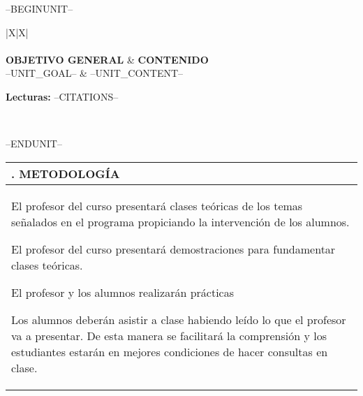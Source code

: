 \documentclass[final]{article}
\begin{document}
	\setcounter{SyllabiUnitCount}{0}
	--BEGINUNIT--
	\addtocounter{SyllabiUnitCount}{1}
	\begin{center}
	\begin{tabularx}{\textwidth}{|X|X|} \hline
	 \\ \hline
	 \\ \hline
	{\bf OBJETIVO GENERAL} & {\bf CONTENIDO} \\ \hline
	--UNIT_GOAL--
	&
	--UNIT_CONTENT--
	\\ \hline
	\multicolumn{2}{|l|}
	{\begin{minipage}{0.95\textwidth}
	{\bf Lecturas:} --CITATIONS--
	\end{minipage}
	}
	\\ \hline
	\end{tabularx}
	\end{center}
	
	--ENDUNIT--
	
	\addtocounter{SyllabiSectionCount}{1}
	\begin{center}
	\begin{tabularx}{\textwidth}{|X|} \hline
	\arabic{SyllabiSectionCount}. METODOLOGÍA \\ \hline
	\begin{evaluation}
	\item El profesor del curso presentará clases teóricas de los temas señalados en el programa propiciando la intervención de los alumnos.
	\item El profesor del curso presentará demostraciones para fundamentar clases teóricas.
	\item El profesor y los alumnos realizarán prácticas
	\item Los alumnos deberán asistir a clase habiendo leído lo que el profesor va a presentar.
	De esta manera se facilitará la comprensión y los estudiantes estarán en mejores condiciones de hacer consultas en clase.
	\end{evaluation}
	\\ \hline
	\end{tabularx}
	\end{center}
	
\end{document}
